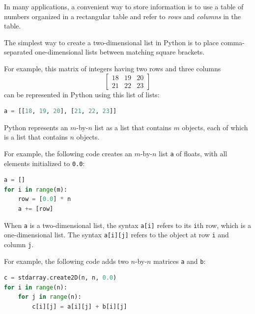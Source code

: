\documentclass[8pt,a4paper,compress,handout]{beamer}
\begin{document}
\begin{frame}[fragile]
In many applications, a convenient way to store information is to use a table of numbers organized in a rectangular table and refer to \emph{rows} and \emph{columns} in the table.

\bigskip

The simplest way to create a two-dimensional list in Python is to place comma-separated one-dimensional lists between matching square brackets. 

\bigskip

For example, this matrix of integers having two rows and three columns 
\[
\begin{bmatrix}
18 & 19 & 20 \\ 
21 & 22 & 23
\end{bmatrix}
\]
can be represented in Python using this list of lists:
\begin{lstlisting}[language=Python]
a = [[18, 19, 20], [21, 22, 23]]
\end{lstlisting}

\bigskip

Python represents an $m$-by-$n$ list as a list that contains $m$ objects, each of which is a list that contains $n$ objects. 

\bigskip

For example, the following code creates an $m$-by-$n$ list \lstinline{a} of floats, with all elements initialized to \lstinline{0.0}:
\begin{lstlisting}[language=Python]
a = []
for i in range(m):
    row = [0.0] * n
    a += [row]
\end{lstlisting}
\end{frame}

\begin{frame}[fragile]
When \lstinline{a} is a two-dimensional list, the syntax \lstinline{a[i]} refers to its \lstinline{i}th row, which is a one-dimensional list. The syntax \lstinline{a[i][j]} refers to the object at row \lstinline{i} and column \lstinline{j}. 

\bigskip

For example, the following code adds two $n$-by-$n$ matrices \lstinline{a} and \lstinline{b}:

\begin{lstlisting}[language=Python]
c = stdarray.create2D(n, n, 0.0)
for i in range(n):
    for j in range(n):
        c[i][j] = a[i][j] + b[i][j]
\end{lstlisting}
\end{frame}
\end{document}
